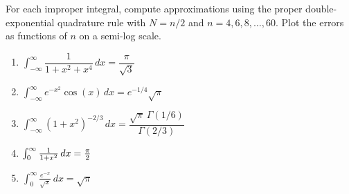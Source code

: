 \begin{exercise}

	For each improper integral, compute approximations using the proper
	double-exponential quadrature rule with $N=n/2$ and $n=4,6,8,\ldots,60$. Plot
	the errors as functions of $n$ on a semi-log scale.
	\begin{enumerate}
		\item $\int_{-\infty}^\infty \dfrac{1}{1+x^2+x^4}\, dx = \dfrac{\pi}{\sqrt{3}}$
		\item $\int_{-\infty}^\infty e^{-x^2}\cos(x)\, dx = e^{-1/4}\sqrt{\pi}$
		\item $\int_{-\infty}^\infty (1+x^2)^{-2/3}\, dx =
			      \dfrac{\sqrt{\pi}\,\Gamma(1/6)}{\Gamma(2/3)}$
		\item $\int_{0}^{\infty} {1\over 1+x^2}\,dx = \frac{\pi}{2}$
		\item $\int_0^\infty \frac{e^{-x}}{\sqrt{x}}\,dx = \sqrt{\pi}$
	\end{enumerate}
\end{exercise}

